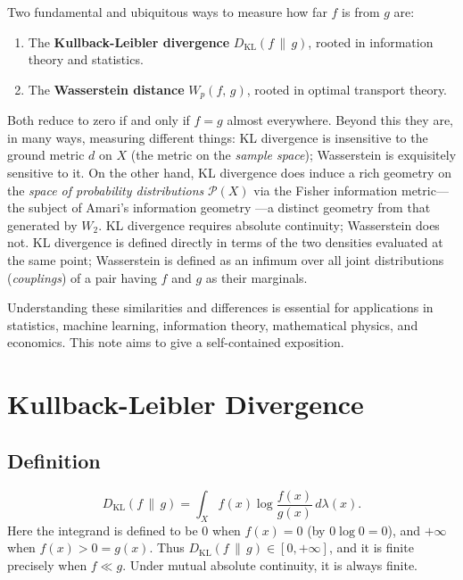 \documentclass[12pt]{article}
\newcommand{\KL}[2]{D_{\mathrm{KL}}\!\left(#1\,\|\,#2\right)}
\newcommand{\Wass}[3]{W_{#1}\!\left(#2,\,#3\right)}
\newcommand{\calP}{\mathcal{P}}
\begin{document}
Two fundamental and ubiquitous ways to measure how far $f$ is
from $g$ are:
\begin{enumerate}
  \item The \textbf{Kullback-Leibler divergence}
    $\KL{f}{g}$, rooted in information theory and statistics.
  \item The \textbf{Wasserstein distance} $\Wass{p}{f}{g}$,
    rooted in optimal transport theory.
\end{enumerate}
Both reduce to zero if and only if $f = g$ almost everywhere.
Beyond this they are, in many ways, measuring different things:
KL divergence is insensitive to the ground metric $d$ on $X$
(the metric on the \emph{sample space}); Wasserstein is
exquisitely sensitive to it.  On the other hand, KL divergence
does induce a rich geometry on the \emph{space of probability
distributions} $\calP(X)$ via the Fisher information metric---the
subject of Amari's information geometry \citep{Amari2016,AmariNagaoka2000}---a
distinct geometry from that generated by $W_2$.  KL divergence requires absolute
continuity; Wasserstein does not.  KL divergence is defined
directly in terms of the two densities evaluated at the same
point; Wasserstein is defined as an infimum over all joint
distributions (\emph{couplings}) of a pair having $f$ and $g$
as their marginals.

Understanding these similarities and differences is essential
for applications in statistics, machine learning, information
theory, mathematical physics, and economics.  This note aims to
give a self-contained exposition.

\section{Kullback-Leibler Divergence}
\label{sec:kl}

\subsection{Definition}

\begin{equation}\label{eq:kl_def}
  \boxed{\KL{f}{g} = \int_X f(x)\log\frac{f(x)}{g(x)}\,d\lambda(x).}
\end{equation}
Here the integrand is defined to be $0$ when $f(x) = 0$ (by
$0\log 0 = 0$), and $+\infty$ when $f(x) > 0 = g(x)$.  Thus
$\KL{f}{g} \in [0, +\infty]$, and it is finite precisely when
$f \ll g$.  Under mutual absolute continuity, it is always
finite.
\end{document}
